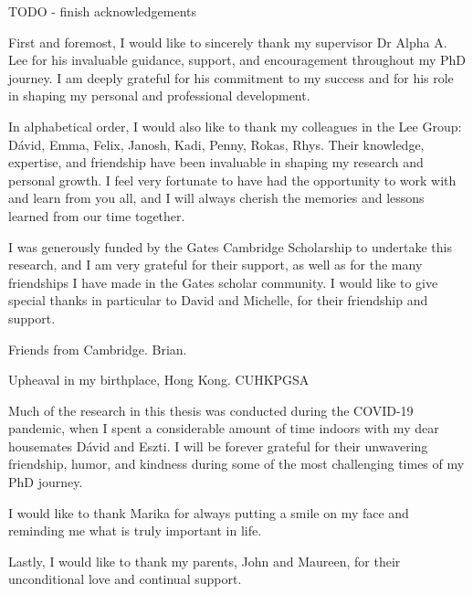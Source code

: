 
\begin{acknowledgements}

TODO - finish acknowledgements

First and foremost, I would like to sincerely thank my supervisor Dr Alpha A. Lee for his invaluable guidance, support, and encouragement throughout my PhD journey. I am deeply grateful for his commitment to my success and for his role in shaping my personal and professional development.

In alphabetical order, I would also like to thank my colleagues in the Lee Group: Dávid, Emma, Felix, Janosh, Kadi, Penny, Rokas, Rhys. Their knowledge, expertise, and friendship have been invaluable in shaping my research and personal growth. I feel very fortunate to have had the opportunity to work with and learn from you all, and I will always cherish the memories and lessons learned from our time together.

I was generously funded by the Gates Cambridge Scholarship to undertake this research, and I am very grateful for their support, as well as for the many friendships I have made in the Gates scholar community. I would like to give special thanks in particular to David and Michelle, for their friendship and support.

Friends from Cambridge. Brian.

Upheaval in my birthplace, Hong Kong. CUHKPGSA

Much of the research in this thesis was conducted during the COVID-19 pandemic, when I spent a considerable amount of time indoors with my dear housemates Dávid and Eszti. I will be forever grateful for their unwavering friendship, humor, and kindness during some of the most challenging times of my PhD journey.

I would like to thank Marika for always putting a smile on my face and reminding me what is truly important in life.

Lastly, I would like to thank my parents, John and Maureen, for their unconditional love and continual support.

\end{acknowledgements}
